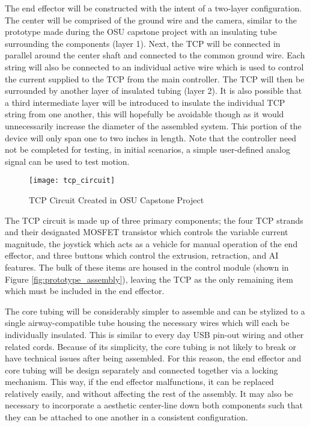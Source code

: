 		The end effector will be constructed with the intent of a two-layer configuration. The center will be comprised of the ground wire and the camera, similar to the prototype made during the OSU capstone project with an insulating tube surrounding the components (layer 1). Next, the TCP will be connected in parallel around the center shaft and connected to the common ground wire. Each string will also be connected to an individual active wire which is used to control the current supplied to the TCP from the main controller. The TCP will then be surrounded by another layer of insulated tubing (layer 2). It is also possible that a third intermediate layer will be introduced to insulate the individual TCP string from one another, this will hopefully be avoidable though as it would unnecessarily increase the diameter of the assembled system. This portion of the device will only span one to two inches in length. Note that the controller need not be completed for testing, in initial scenarios, a simple user-defined analog signal can be used to test motion.
		
		\begin{figure}[ht]
			\centering
			\texttt{[image: tcp\_circuit]}
			\caption{TCP Circuit Created in OSU Capstone Project}
			\label{fig:tcp_circuit}
		\end{figure}
		
		The TCP circuit is made up of three primary components; the four TCP strands and their designated MOSFET transistor which controls the variable current magnitude, the joystick which acts as a vehicle for manual operation of the end effector, and three buttons which control the extrusion, retraction, and AI features. The bulk of these items are housed in the control module (shown in Figure \ref{fig:prototype_assembly}), leaving the TCP as the only remaining item which must be included in the end effector.

		The core tubing will be considerably simpler to assemble and can be stylized to a single airway-compatible tube housing the necessary wires which will each be individually insulated. This is similar to every day USB pin-out wiring and other related cords. Because of its simplicity, the core tubing is not likely to break or have technical issues after being assembled. For this reason, the end effector and core tubing will be design separately and connected together via a locking mechanism. This way, if the end effector malfunctions, it can be replaced relatively easily, and without affecting the rest of the assembly. It may also be necessary to incorporate a aesthetic center-line down both components such that they can be attached to one another in a consistent configuration.
	
